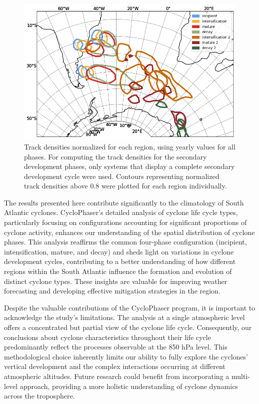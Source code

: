 \begin{figure}[!htbp]
\centering
\includegraphics[width=\textwidth]{figs_4/density_map_Aggregate.png}
\caption[Illustrative Representation of Cyclone Life Cycle]{Track densities normalized for each region, using yearly values for all phases. For computing the track densities for the secondary development phases, only systems that display a complete secondary development cycle were used. Contours representing normalized track densities above 0.8 were plotted for each region individually.}
\label{fig:density_map_Aggregate}
\end{figure}

The results presented here contribute significantly to the climatology of South Atlantic cyclones. CycloPhaser's detailed analysis of cyclone life cycle types, particularly focusing on configurations accounting for significant proportions of cyclone activity, enhances our understanding of the spatial distribution of cyclone phases. This analysis reaffirms the common four-phase configuration (incipient, intensification, mature, and decay) and sheds light on variations in cyclone development cycles, contributing to a better understanding of how different regions within the South Atlantic influence the formation and evolution of distinct cyclone types. These insights are valuable for improving weather forecasting and developing effective mitigation strategies in the region.

Despite the valuable contributions of the CycloPhaser program, it is important to acknowledge the study's limitations. The analysis at a single atmospheric level offers a concentrated but partial view of the cyclone life cycle. Consequently, our conclusions about cyclone characteristics throughout their life cycle predominantly reflect the processes observable at the 850 hPa level. This methodological choice inherently limits our ability to fully explore the cyclones' vertical development and the complex interactions occurring at different atmospheric altitudes. Future research could benefit from incorporating a multi-level approach, providing a more holistic understanding of cyclone dynamics across the troposphere.

